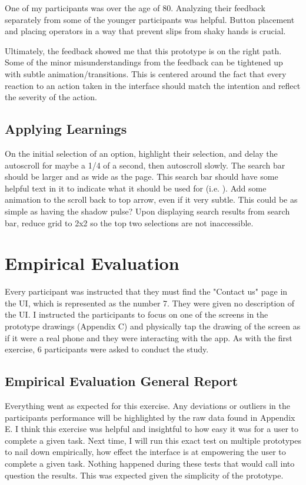 One of my participants was over the age of 80. Analyzing their feedback separately from some of the younger participants was helpful. Button placement and placing operators in a way that prevent slips from shaky hands is crucial.

Ultimately, the feedback showed me that this prototype is on the right path. Some of the minor misunderstandings from the feedback can be tightened up with subtle animation/transitions. This is centered around the fact that every reaction to an action taken in the interface should match the intention and reflect the severity of the action.

\subsection{Applying Learnings}

On the initial selection of an option, highlight their selection, and delay the autoscroll for maybe a 1/4 of a second, then autoscroll slowly. The search bar should be larger and as wide as the page. This search bar should have some helpful text in it to indicate what it should be used for (i.e. ). Add some animation to the scroll back to top arrow, even if it very subtle. This could be as simple as having the shadow pulse? Upon displaying search results from search bar, reduce grid to 2x2 so the top two selections are not inaccessible.

\section{Empirical Evaluation}

Every participant was instructed that they must find the "Contact us" page in the UI, which is represented as the number 7. They were given no description of the UI. I instructed the participants to focus on one of the screens in the prototype drawings (Appendix C) and physically tap the drawing of the screen as if it were a real phone and they were interacting with the app. As with the first exercise, 6 participants were asked to conduct the study.

\subsection{Empirical Evaluation General Report}
Everything went as expected for this exercise. Any deviations or outliers in the participants performance will be highlighted by the raw data found in Appendix E. I think this exercise was helpful and insightful to how easy it was for a user to complete a given task. Next time, I will run this exact test on multiple prototypes to nail down empirically, how effect the interface is at empowering the user to complete a given task. Nothing happened during these tests that would call into question the results. This was expected given the simplicity of the prototype.

